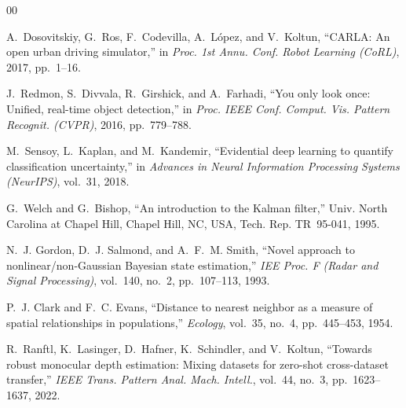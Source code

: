 \documentclass[conference]{IEEEtran}
\begin{document}
\begin{thebibliography}{00}

A.~Dosovitskiy, G.~Ros, F.~Codevilla, A.~L{\'o}pez, and V.~Koltun,
``CARLA: An open urban driving simulator,'' in \textit{Proc. 1st Annu.
Conf. Robot Learning (CoRL)}, 2017, pp.~1--16.

J.~Redmon, S.~Divvala, R.~Girshick, and A.~Farhadi, ``You only look
once: Unified, real-time object detection,'' in \textit{Proc. IEEE
Conf. Comput. Vis. Pattern Recognit. (CVPR)}, 2016, pp.~779--788.

M.~Sensoy, L.~Kaplan, and M.~Kandemir, ``Evidential deep learning to
quantify classification uncertainty,'' in \textit{Advances in Neural
Information Processing Systems (NeurIPS)}, vol.~31, 2018.

G.~Welch and G.~Bishop, ``An introduction to the Kalman filter,''
Univ. North Carolina at Chapel Hill, Chapel Hill, NC, USA, Tech. Rep.
TR~95-041, 1995.

N.~J. Gordon, D.~J. Salmond, and A.~F.~M. Smith, ``Novel approach to
nonlinear/non-Gaussian Bayesian state estimation,'' \textit{IEE Proc.
F (Radar and Signal Processing)}, vol.~140, no.~2, pp.~107--113, 1993.

P.~J. Clark and F.~C. Evans, ``Distance to nearest neighbor as a
measure of spatial relationships in populations,'' \textit{Ecology},
vol.~35, no.~4, pp.~445--453, 1954.

R.~Ranftl, K.~Lasinger, D.~Hafner, K.~Schindler, and V.~Koltun,
``Towards robust monocular depth estimation: Mixing datasets for
zero-shot cross-dataset transfer,'' \textit{IEEE Trans. Pattern Anal.
Mach. Intell.}, vol.~44, no.~3, pp.~1623--1637, 2022.

\end{thebibliography}
\end{document}
